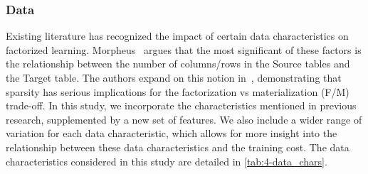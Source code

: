 \subsubsection{Data}
Existing literature has recognized the impact of certain data characteristics on factorized learning. Morpheus~\cite{morpheus} argues that the most significant of these factors is the relationship between the number of columns/rows in the Source tables and the Target table. The authors expand on this notion in~\cite{MorpheusFI}, demonstrating that sparsity has serious implications for the factorization vs materialization (F/M) trade-off. In this study, we incorporate the characteristics mentioned in previous research, supplemented by a new set of features. We also include a wider range of variation for each data characteristic, which allows for more insight into the relationship between these data characteristics and the training cost. The data characteristics considered in this study are detailed in \autoref{tab:4-data_chars}.

